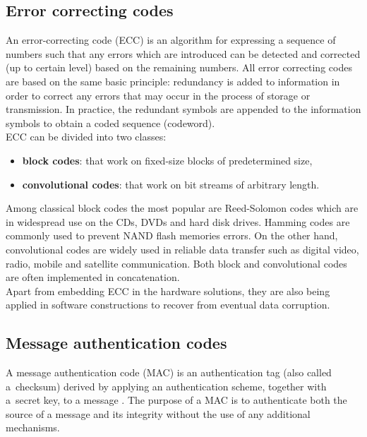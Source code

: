 		\subsection{Error correcting codes}
An error-correcting code (ECC) is an algorithm for expressing a sequence of
numbers such that any errors which are introduced can be detected and corrected
(up to certain level) based on the remaining numbers. All error
correcting codes are based on the same basic principle: redundancy is added to
information in order to correct any errors that may occur in the process of
storage or transmission. In practice, the redundant symbols are appended to the
information symbols to obtain a coded sequence (codeword).\\

ECC can be divided into two classes:\\

\begin{itemize}
	\item \textbf{block codes}: that work on fixed-size blocks of predetermined
	size,
	\item \textbf{convolutional codes}: that work on bit streams of arbitrary
	length.
\end{itemize}

Among classical block codes the most popular are Reed-Solomon codes which are
in widespread use on the CDs, DVDs and hard disk drives. Hamming codes are
commonly used to prevent NAND flash memories errors. On the other hand,
convolutional codes are widely used in reliable data transfer such as digital
video, radio, mobile and satellite communication. Both block and convolutional
codes are often implemented in concatenation.\\

Apart from embedding ECC in the hardware solutions, they are also being applied
in software constructions to recover from eventual data corruption.

		\subsection{Message authentication codes}
A message authentication code (MAC) is an authentication tag (also called 
a~checksum) derived by applying an authentication scheme, together with 
a~secret key, to a message \cite{nist-hmac}. The purpose of a MAC is to
authenticate both the source of a message and its integrity without the use of
any additional mechanisms.\\

